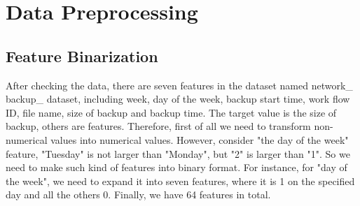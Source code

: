 \documentclass{article}
\begin{document}
\section{Data Preprocessing}
\subsection{Feature Binarization}
After checking the data, there are seven features in the dataset named network\_ backup\_ dataset, including week, day of the week, backup start time, work flow ID, file name, size of backup and backup time. The target value is the size of backup, others are features. Therefore, first of all we need to transform non-numerical values into numerical values. However, consider "the day of the week" feature, "Tuesday" is not larger than "Monday", but "2" is larger than "1". So we need to make such kind of features into binary format. For instance, for "day of the week", we need to expand it into seven features, where it is 1 on the specified day and all the others 0. Finally, we have 64 features in total.
\end{document}
